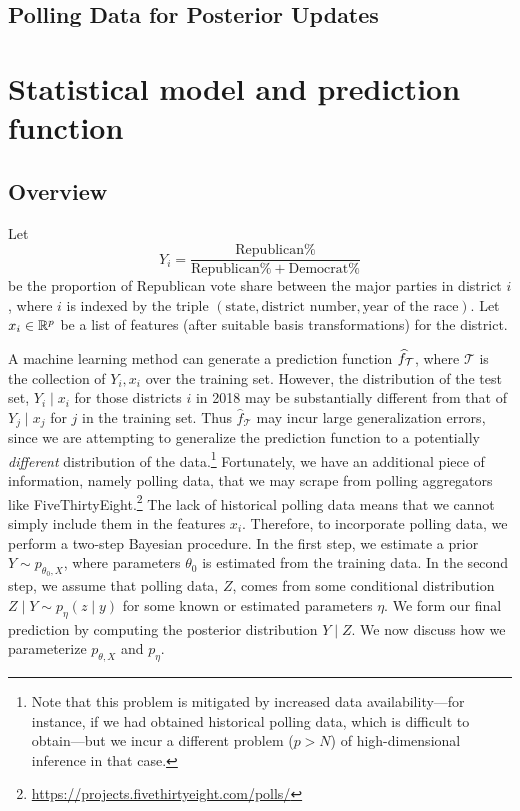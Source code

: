 \documentclass[11pt]{article}
\begin{document}
\subsection{Polling Data for Posterior Updates}
\section{Statistical model and prediction function}
\subsection{Overview}
Let \[Y_i = \frac{\text{Republican}\% }{\text{Republican}\% + \text{Democrat}\%}\] be the proportion of Republican vote share between the major parties in district $i$, where $i$ is indexed by the triple $(\text{state}, \text{district number}, \text{year of the race})$.
Let $x_i\in \R^p$ be a list of features (after suitable basis transformations)
for the district. 

A machine learning method can generate a prediction function $\hat f_{\cal T}$,
where $\mathcal T$ is the collection of $Y_i, x_i$ over the training set.
However, the
distribution of the test set, $Y_i \mid x_i$ for those districts $i$ in 2018 may
be
substantially different from that of $Y_j \mid x_j$ for $j$ in the training
set. Thus $\hat f_{\mathcal T}$ may incur large generalization errors, since we
are attempting to generalize the prediction function to a potentially 
\emph{different}
distribution
of the data.\footnote{Note that this problem is mitigated by increased data
availability---for instance, if we had obtained historical polling data,
which is difficult to obtain---but we incur a different problem ($p > N$) of
high-dimensional
inference in that case.} Fortunately, we have an additional piece of
information, namely polling data, that we may scrape from polling aggregators
like
FiveThirtyEight.\footnote{\url{https://projects.fivethirtyeight.com/polls/}} The
lack of historical polling data means that we cannot simply include them in the
features $x_i$. Therefore, to incorporate polling data, we perform a two-step
Bayesian procedure. In the first step, we estimate a prior $Y \sim p_{\theta_0,
X}$, where parameters $\theta_0$ is estimated from the training data. In the
second step, we assume that polling data, $Z$, comes from some conditional
distribution $Z \mid Y \sim p_{\eta}(z\mid y)$ for some known or
estimated parameters
$\eta$. We form our final prediction by computing the posterior distribution $Y
\mid Z$. We now discuss how we parameterize $p_{\theta, X}$ and $p_\eta$.
\end{document}
